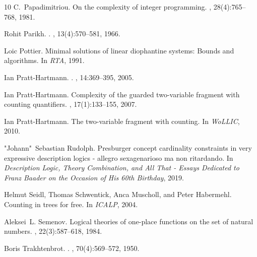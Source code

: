 \documentclass[10pt,a4paper]{article}
\theoremstyle{definition}
\theoremstyle{remark}
\begin{document}
\begin{thebibliography}{10}
C.~Papadimitriou.
\newblock On the complexity of integer programming.
, 28(4):765--768, 1981.

Rohit Parikh.
.
, 13(4):570–581, 1966.

Loic Pottier.
\newblock Minimal solutions of linear diophantine systems: Bounds and algorithms.
\newblock In {\em RTA}, 1991.

Ian Pratt-Hartmann.
.
, 14:369–395, 2005.

Ian Pratt-Hartmann.
\newblock Complexity of the guarded two-variable fragment with counting quantifiers.
, 17(1):133--155, 2007.

Ian Pratt{-}Hartmann.
\newblock The two-variable fragment with counting.
\newblock In {\em {WoLLIC}}, 2010.

"Johann"~Sebastian Rudolph.
\newblock Presburger concept cardinality constraints in very expressive description logics - allegro sexagenarioso ma non ritardando.
\newblock In {\em Description Logic, Theory Combination, and All That - Essays Dedicated to Franz Baader on the Occasion of His 60th Birthday}, 2019.

Helmut Seidl, Thomas Schwentick, Anca Muscholl, and Peter Habermehl.
\newblock Counting in trees for free.
\newblock In {\em ICALP}, 2004.

Aleksei~L. Semenov.
\newblock Logical theories of one-place functions on the set of natural numbers.
, 22(3):587--618, 1984.

Boris Trakhtenbrot.
.
, 70(4):{569–572}, 1950.

\end{thebibliography}
\end{document}
